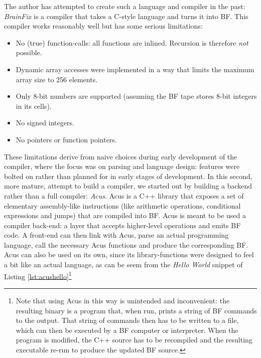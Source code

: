 The author has attempted to create such a language and compiler in the past: \emph{BrainFix} \cite{brainfix} is a compiler that takes a C-style language and turns it into BF. This compiler works reasonably well but has some serious limitations:
\begin{itemize}\itemsep0em 
\item No (true) function-calls: all functions are inlined. Recursion is therefore \emph{not} possible.
\item Dynamic array accesses were implemented in a way that limits the maximum array size to 256 elements.
\item Only 8-bit numbers are supported (assuming the BF tape stores 8-bit integers in its cells).
\item No signed integers.
\item No pointers or function pointers.
\end{itemize}
%
These limitations derive from naive choices during early development of the compiler, where the focus was on parsing and language design: features were bolted on rather than planned for in early stages of development. In this second, more mature, attempt to build a compiler, we started out by building a backend rather than a full compiler: \emph{Acus}. Acus is a C++ library that exposes a set of elementary assembly-like instructions (like arithmetic operations, conditional expressions and jumps) that are compiled into BF. Acus is meant to be used a compiler back-end: a layer that accepts higher-level operations and emits BF code. A front-end can then link with Acus, parse an actual programming language, call the necessary Acus functions and produce the corresponding BF. Acus can also be used on its own, since its library-functions were designed to feel a bit like an actual language, as can be seem from the \emph{Hello World} snippet of Listing \ref{lst:acushello}\footnote{Note that using Acus in this way is unintended and inconvenient: the resulting binary is a program that, when run, prints a string of BF commands to the output. That string of commands then has to be written to a file, which can then be executed by a BF computer or interpreter. When the program is modified, the C++ source has to be recompiled and the resulting executable re-run to produce the updated BF source.}

